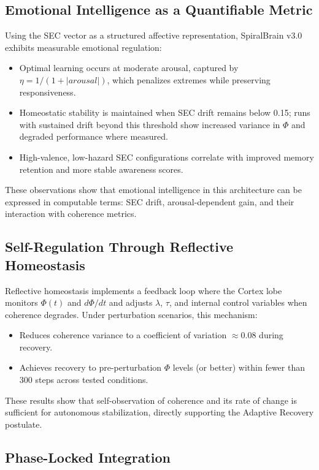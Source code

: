 \documentclass[11pt,a4paper]{article}
\begin{document}
\subsection{Emotional Intelligence as a Quantifiable Metric}

Using the SEC vector as a structured affective representation, SpiralBrain v3.0 exhibits measurable emotional regulation:
\begin{itemize}[leftmargin=2em]
    \item Optimal learning occurs at moderate arousal, captured by \( \eta = 1/(1 + |arousal|) \), which penalizes extremes while preserving responsiveness.
    \item Homeostatic stability is maintained when SEC drift remains below 0.15; runs with sustained drift beyond this threshold show increased variance in \( \Phi \) and degraded performance where measured.
    \item High-valence, low-hazard SEC configurations correlate with improved memory retention and more stable awareness scores.
\end{itemize}
These observations show that emotional intelligence in this architecture can be expressed in computable terms: SEC drift, arousal-dependent gain, and their interaction with coherence metrics.

\subsection{Self-Regulation Through Reflective Homeostasis}

Reflective homeostasis implements a feedback loop where the Cortex lobe monitors \( \Phi(t) \) and \( d\Phi/dt \) and adjusts \( \lambda \), \( \tau \), and internal control variables when coherence degrades. Under perturbation scenarios, this mechanism:
\begin{itemize}[leftmargin=2em]
    \item Reduces coherence variance to a coefficient of variation \( \approx 0.08 \) during recovery.
    \item Achieves recovery to pre-perturbation \( \Phi \) levels (or better) within fewer than 300 steps across tested conditions.
\end{itemize}
These results show that self-observation of coherence and its rate of change is sufficient for autonomous stabilization, directly supporting the Adaptive Recovery postulate.

\subsection{Phase-Locked Integration}
\end{document}
